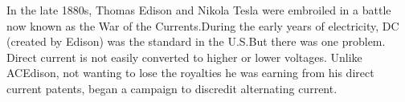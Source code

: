 \documentclass[preview]{standalone}
\begin{document}
\centering \dot In the late 1880s, Thomas Edison and Nikola Tesla were embroiled in a battle now known as the War of the Currents.\newline \dot During the early years of electricity, DC (created by Edison) was the standard in the U.S.\newline \dot But there was one problem. Direct current is not easily converted to higher or lower voltages. Unlike AC\newline \dot Edison, not wanting to lose the royalties he was earning from his direct current patents, began a campaign to discredit alternating current.
\end{document}
